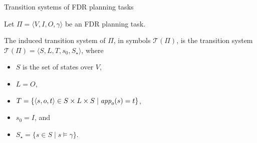 \documentclass{gkibeamer}
\begin{document}
\begin{frame}{Transition systems of FDR planning tasks}
  \begin{definition}
    Let $\Pi = \langle V, I, O, \gamma\rangle$ be an FDR planning task.

    The \alert{induced transition system of $\Pi$}, in symbols \alert{$\mathcal
    T(\Pi)$}, is the transition system $\mathcal T(\Pi) =
    \langle S, L, T, s_0, S_\star\rangle$, where
    \begin{itemize}
    \item $S$ is the set of states over $V$,
    \item $L = O$,
    \item $T = \{\langle s, o, t\rangle \in
      S \times L \times S \mid
      \textit{app}_{o}(s) = t\}$,
    \item $s_0 = I$, and
    \item $S_\star = \{s \in S \mid s \models \gamma\}$.
    \end{itemize}
  \end{definition}
\end{frame}
\end{document}
